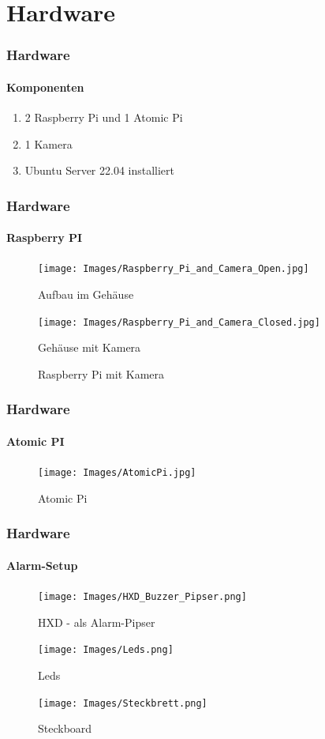 \documentclass[]{beamer}
\begin{document}
\section{Hardware}

\begin{frame}
	\frametitle{Hardware}
	\framesubtitle{Komponenten}
	\begin{enumerate}
		\item 2  Raspberry Pi und 1 Atomic Pi
		\item 1 Kamera
		\item Ubuntu Server 22.04 installiert
	\end{enumerate}
\end{frame}

\begin{frame}
	\frametitle{Hardware}
	\framesubtitle{Raspberry PI}
	\begin{figure}
		\centering
		\begin{minipage}[t]{0.45\textwidth}
			\centering
			\texttt{[image: Images/Raspberry\_Pi\_and\_Camera\_Open.jpg]}
			\caption*{Aufbau im Gehäuse}
		\end{minipage}
		\hfill
		\begin{minipage}[t]{0.45\textwidth}
			\centering
			\texttt{[image: Images/Raspberry\_Pi\_and\_Camera\_Closed.jpg]}
			\caption*{Gehäuse mit Kamera}
		\end{minipage}
		\hfill
		\caption{Raspberry Pi mit Kamera}
		\label{fig:Raspberry PI}
	\end{figure}
\end{frame}

\begin{frame}
	\frametitle{Hardware}
	\framesubtitle{Atomic PI}
	\begin{figure}
		\centering
		\begin{minipage}[t]{1\textwidth}
			\centering
			\texttt{[image: Images/AtomicPi.jpg]}
		\end{minipage}
		\caption{Atomic Pi}
		\label{fig:Atomic Pi}
	\end{figure}
\end{frame}

\begin{frame}
	\frametitle{Hardware}
	\framesubtitle{Alarm-Setup}
	\begin{figure}
		\centering
		\begin{minipage}{0.32\textwidth}
			\centering
			\texttt{[image: Images/HXD\_Buzzer\_Pipser.png]} 
			\caption{HXD - als Alarm-Pipser}
		\end{minipage}\hfill
		\begin{minipage}{0.32\textwidth}
			\centering
			\texttt{[image: Images/Leds.png]} 
			\caption{Leds}
		\end{minipage}\hfill
		\begin{minipage}{0.32\textwidth}
			\centering
			\texttt{[image: Images/Steckbrett.png]}
			\caption{Steckboard}
		\end{minipage}
	\end{figure}
\end{frame}
\end{document}

